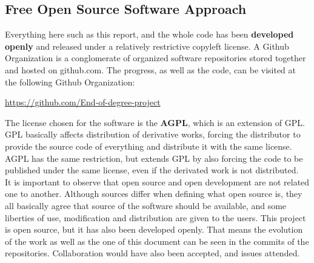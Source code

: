 \subsection{Free Open Source Software Approach}
Everything here such as this report, and the whole code has been \textbf{developed openly} and released under a relatively restrictive copyleft license. A Github Organization is a conglomerate of organized software repositories stored together and hosted on github.com. The progress, as well as the code, can be visited at the following Github Organization:
\begin{center}\url{https://github.com/End-of-degree-project}\end{center}
The license chosen for the software is the \textbf{AGPL}, which is an extension of GPL. GPL basically affects distribution of derivative works, forcing the distributor to provide the source code of everything and distribute it with the same license. AGPL has the same restriction, but extends GPL by also forcing the code to be published under the same license, even if the derivated work is not distributed.\\[.2cm]
It is important to observe that open source and open development are not related one to another. Although sources differ when defining what open source is, they all basically agree that source of the software should be available, and some liberties of use, modification and distribution are given to the users. This project is open source, but it has also been developed openly. That means the evolution of the work as well as the one of this document can be seen in the commits of the repositories. Collaboration would have also been accepted, and issues attended.
